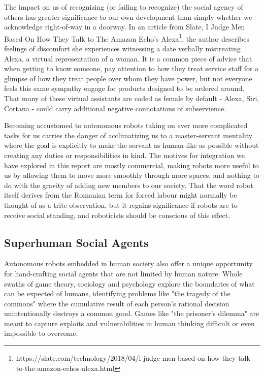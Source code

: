 \documentclass{sfuthesis}
\begin{document}
The impact on us of recognizing (or failing to recognize) the social agency of others has greater significance to our own development than simply whether we acknowledge right-of-way in a doorway. In an article from Slate, I Judge Men Based On How They Talk to The Amazon Echo's Alexa\footnote{https://slate.com/technology/2018/04/i-judge-men-based-on-how-they-talk-to-the-amazon-echos-alexa.html}, the author describes feelings of discomfort she experiences witnessing a date verbally mistreating Alexa, a virtual representation of a woman. It is a common piece of advice that when getting to know someone, pay attention to how they treat service staff for a glimpse of how they treat people over whom they have power, but not everyone feels this same sympathy engage for products designed to be ordered around. That many of these virtual assistants are coded as female by default - Alexa, Siri, Cortana - could carry additional negative connotations of subservience.

Becoming accustomed to autonomous robots taking on ever more complicated tasks for us carries the danger of acclimatizing us to a master-servant mentality where the goal is explicitly to make the servant as human-like as possible without creating any duties or responsibilities in kind. The motives for integration we have explored in this report are mostly commercial, making robots more useful to us by allowing them to move more smoothly through more spaces, and nothing to do with the gravity of adding new members to our society. That the word robot itself derives from the Romanian term for forced labour might normally be thought of as a trite observation, but it regains significance if robots are to receive social standing, and roboticists should be conscious of this effect.

\subsection{Superhuman Social Agents}

Autonomous robots embedded in human society also offer a unique opportunity for hand-crafting social agents that are not limited by human nature. Whole swaths of game theory, sociology and psychology explore the boundaries of what can be expected of humans, identifying problems like "the tragedy of the commons" where the cumulative result of each person's rational decision unintentionally destroys a common good. Games like "the prisoner's dilemma" are meant to capture exploits and vulnerabilities in human thinking difficult or even impossible to overcome.
\end{document}
